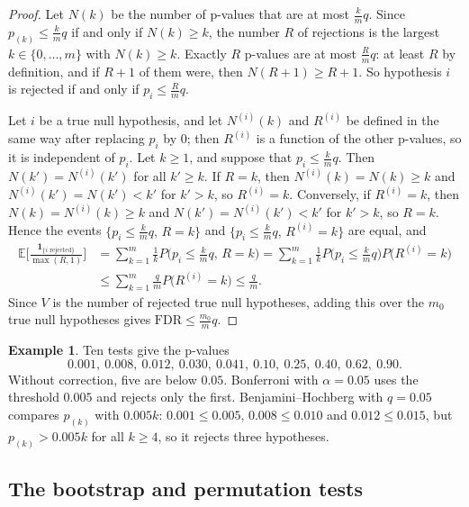 \documentclass[11pt]{article}
\newcommand{\E}{\mathbb{E}}
\theoremstyle{definition}
\newtheorem{example}[definition]{Example}
\theoremstyle{plain}
\theoremstyle{remark}
\begin{document}
\begin{proof}
    Let $N(k)$ be the number of p-values that are at most $\frac{k}{m}q$. Since $p_{(k)} \leq \frac{k}{m}q$ if and only if $N(k) \geq k$, the number $R$ of rejections is the largest $k \in \{0, \ldots, m\}$ with $N(k) \geq k$. Exactly $R$ p-values are at most $\frac{R}{m}q$: at least $R$ by definition, and if $R + 1$ of them were, then $N(R + 1) \geq R + 1$. So hypothesis $i$ is rejected if and only if $p_i \leq \frac{R}{m}q$.

    Let $i$ be a true null hypothesis, and let $N^{(i)}(k)$ and $R^{(i)}$ be defined in the same way after replacing $p_i$ by $0$; then $R^{(i)}$ is a function of the other p-values, so it is independent of $p_i$. Let $k \geq 1$, and suppose that $p_i \leq \frac{k}{m}q$. Then $N(k') = N^{(i)}(k')$ for all $k' \geq k$. If $R = k$, then $N^{(i)}(k) = N(k) \geq k$ and $N^{(i)}(k') = N(k') < k'$ for $k' > k$, so $R^{(i)} = k$. Conversely, if $R^{(i)} = k$, then $N(k) = N^{(i)}(k) \geq k$ and $N(k') = N^{(i)}(k') < k'$ for $k' > k$, so $R = k$. Hence the events $\{p_i \leq \frac{k}{m}q, \, R = k\}$ and $\{p_i \leq \frac{k}{m}q, \, R^{(i)} = k\}$ are equal, and
    \begin{align*}
        \E\Big[\frac{\mathbf{1}_{\{i \text{ rejected}\}}}{\max(R, 1)}\Big] &= \sum_{k=1}^m \frac{1}{k}P\Big(p_i \leq \frac{k}{m}q, \, R = k\Big) = \sum_{k=1}^m \frac{1}{k}P\Big(p_i \leq \frac{k}{m}q\Big)P\big(R^{(i)} = k\big) \\
        &\leq \sum_{k=1}^m \frac{q}{m}P\big(R^{(i)} = k\big) \leq \frac{q}{m}.
    \end{align*}
    Since $V$ is the number of rejected true null hypotheses, adding this over the $m_0$ true null hypotheses gives $\mathrm{FDR} \leq \frac{m_0}{m}q$.
\end{proof}

\begin{example}\label{ex:multiple-testing}
    Ten tests give the p-values
    \[0.001, \ 0.008, \ 0.012, \ 0.030, \ 0.041, \ 0.10, \ 0.25, \ 0.40, \ 0.62, \ 0.90.\]
    Without correction, five are below $0.05$. Bonferroni with $\alpha = 0.05$ uses the threshold $0.005$ and rejects only the first. Benjamini--Hochberg with $q = 0.05$ compares $p_{(k)}$ with $0.005k$: $0.001 \leq 0.005$, $0.008 \leq 0.010$ and $0.012 \leq 0.015$, but $p_{(k)} > 0.005k$ for all $k \geq 4$, so it rejects three hypotheses.
\end{example}

\subsection{The bootstrap and permutation tests}
\end{document}
